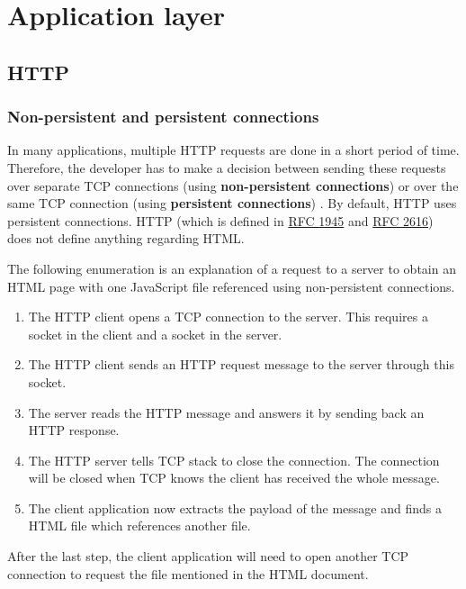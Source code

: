 \section{Application layer}

\subsection{HTTP}

\subsubsection{Non-persistent and persistent connections}

In many applications, multiple HTTP requests are done in a short period of time.
Therefore, the developer has to make a decision between sending these requests over separate TCP connections (using \textbf{non-persistent connections}) or over the same TCP connection (using \textbf{persistent connections}) \cite[p.~100]{computer-networking-kurose-2012}. By default, HTTP uses persistent connections.
HTTP (which is defined in \href{https://tools.ietf.org/html/rfc1945}{RFC 1945} and \href{https://tools.ietf.org/html/rfc2616}{RFC 2616}) does not define anything regarding HTML.

The following enumeration is an explanation of a request to a server to obtain an HTML page with one JavaScript file referenced using non-persistent connections.

\begin{enumerate}
\item The HTTP client opens a TCP connection to the server.
This requires a socket in the client and a socket in the server.
\item The HTTP client sends an HTTP request message to the server through this socket.
\item The server reads the HTTP message and answers it by sending back an HTTP response.
\item The HTTP server tells TCP stack to close the connection.
The connection will be closed when TCP knows the client has received the whole message.
\item The client application now extracts the payload of the message and finds a HTML file which references another file.
\end{enumerate}

After the last step, the client application will need to open another TCP connection to request the file mentioned in the HTML document.

